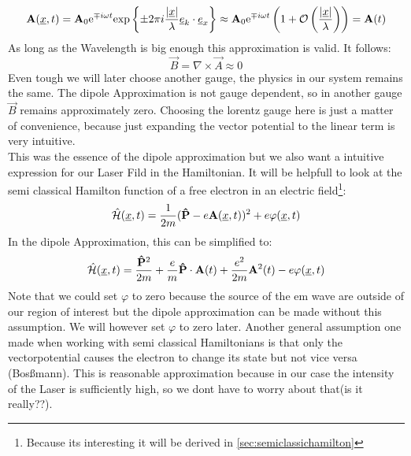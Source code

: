 \begin{equation*}
    \mathbf{A}(\underline{x}, t) = \mathbf{A}_0\mathrm{e}^{\mp i \omega t}\mathrm{exp}\left\{\pm2\pi i\frac{|\underline{x}|}{\lambda}\underline{e}_k \cdot \underline{e}_x\right\} \approx \mathbf{A}_0 \mathrm{e}^{\mp i \omega t}\left(1+\mathcal{O}\left(\frac{|\underline{x}|}{\lambda}\right)\right) = \mathbf{A}(t)
\end{equation*}
As long as the Wavelength is big enough this approximation is valid. It follows:
\begin{equation*}
    \vec{B} = \nabla \times \vec{A} \approx 0
\end{equation*}
Even tough we will later choose another gauge, the physics in our system remains the same. The dipole Approximation is not gauge dependent, so in another gauge $\vec{B}$ remains approximately zero.
Choosing the lorentz gauge here is just a matter of convenience, because just expanding the vector potential to the linear term is very intuitive. \\
This was the essence of the dipole approximation but we also want a intuitive expression for our Laser Fild in the Hamiltonian.
It will be helpfull to look at the semi classical Hamilton function of a free electron in an electric field\footnote{Because its interesting it will be derived in \ref{sec:semiclassichamilton}}: %
\begin{equation} %
    \hat{\Hs}(\uvec{x}, t) = \frac{1}{2m}(\vec{\hat{P}} - e \vec{A}(\uvec{x}, t))^2 + e \varphi(\uvec{x}, t)  \label{eq:semiClassicalHamilton}    %
\end{equation}
In the dipole Approximation, this can be simplified to:
\begin{equation*}
    \hat{\Hs}(\uvec{x}, t) = \frac{\vec{\hat{P}}^2}{2m} + \frac{e}{m}\vec{\hat{P}}\cdot \vec{A}(t) + \frac{e^2}{2m}\vec{A}^2(t) - e \varphi(\uvec{x}, t) %
\end{equation*}
Note that we could set $\varphi$ to zero because the source of the em wave are outside of our region of interest but the dipole approximation can be made without this assumption. 
We will however set $\varphi$ to zero later. 
Another general assumption one made when working with semi classical Hamiltonians is that only the vectorpotential causes the electron to change its state but not vice versa (Bosßmann). 
This is reasonable approximation because in our case the intensity of the Laser is sufficiently high, so we dont have to worry about that(is it really??).
